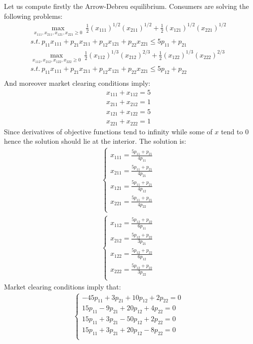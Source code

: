 \documentclass[a4paper]{article}
\begin{document}
Let us compute firstly the Arrow-Debreu equilibrium. Consumers are solving the following problems:
\begin{align*}\
\underset{x_{111}, x_{211}, x_{121}, x_{221} \ge 0}{\max}\ \frac{1}{2} (x_{111})^{1/2} (x_{211})^{1/2} + \frac{1}{2} (x_{121})^{1/2}(x_{221})^{1/2}\\
s.t.\ p_{11}x_{111} + p_{21}x_{211} + p_{12}x_{121} + p_{22}x_{221} \le 5p_{11} + p_{21}\\
\underset{x_{112}, x_{212}, x_{122}, x_{222} \ge 0}{\max}\ \frac{1}{2} (x_{112})^{1/3} (x_{212})^{2/3} + \frac{1}{2} (x_{122})^{1/3}(x_{222})^{2/3}\\
s.t.\ p_{11}x_{111} + p_{21}x_{211} + p_{12}x_{121} + p_{22}x_{221} \le 5p_{12} + p_{22}\\
\end{align*}
And moreover market clearing conditions imply:
\begin{align*}
x_{111} + x_{112} = 5 \nonumber\\
x_{211} + x_{212} = 1\nonumber\\
x_{121} + x_{122} = 5\\
x_{221} + x_{222} = 1\nonumber
\end{align*}
Since derivatives of objective functions tend to infinity while some of $x$ tend to 0 hence the solution should lie at the interior. The solution is:
\begin{align*}
\begin{cases}
x_{111} = \frac{5p_{11} + p_{21}}{4p_{11}}\\
x_{211} = \frac{5p_{11} + p_{21}}{4p_{21}}\\
x_{121} = \frac{5p_{11} + p_{21}}{4p_{12}}\\
x_{221} = \frac{5p_{11} + p_{21}}{4p_{22}}\\
\end{cases}\\
\begin{cases}
x_{112} = \frac{5p_{12} + p_{22}}{6p_{11}}\\
x_{212} = \frac{5p_{12} + p_{22}}{3p_{21}}\\
x_{122} = \frac{5p_{12} + p_{22}}{6p_{12}}\\
x_{222} = \frac{5p_{12} + p_{22}}{3p_{22}}\\
\end{cases} 
\end{align*}
Market clearing conditions imply that:
\begin{align*}
\begin{cases}
-45p_{11} + 3p_{21} + 10p_{12} + 2p_{22} = 0\\
15p_{11} - 9p_{21} + 20p_{12} + 4p_{22} = 0\\
15p_{11} + 3p_{21} - 50p_{12} + 2p_{22} = 0\\
15p_{11} + 3p_{21} +20p_{12} - 8p_{22} = 0\\
\end{cases}
\end{align*}
\end{document}

